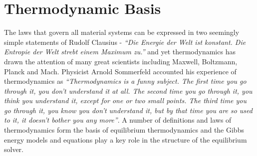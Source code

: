 \chapter{Thermodynamic Basis} \label{chap:thermo}

The laws that govern all material systems can be expressed in two seemingly simple statements of Rudolf Clausius - \emph{``Die Energie der Welt ist konstant. Die Entropie der Welt strebt einem Maximum zu.''} and yet thermodynamics has drawn the attention of many great scientists including Maxwell, Boltzmann, Planck and  Mach. Physicist Arnold Sommerfeld accounted his experience of thermodynamics as \emph{``Thermodynamics is a funny subject. The first time you go through it, you don't understand it at all. The second time you go through it, you think you understand it, except for one or two small points. The third time you go through it, you know you don't understand it, but by that time you are so used to it, it doesn't bother you any more''}. A number of definitions and laws of thermodynamics form the basis of equilibrium thermodynamics and the Gibbs energy models and equations play a key role in the structure of the equilibrium solver.

%

